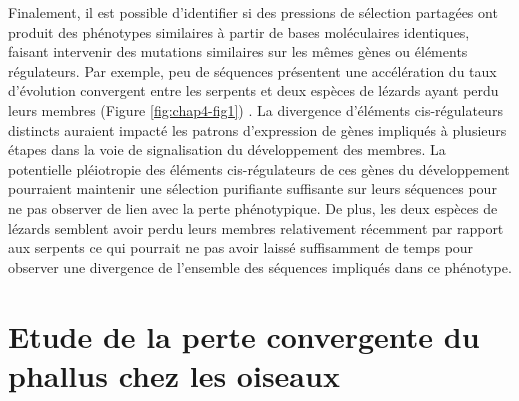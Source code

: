 Finalement, il est possible d’identifier si des pressions de sélection partagées ont produit des phénotypes similaires à partir de bases moléculaires identiques, faisant intervenir des mutations similaires sur les mêmes gènes ou éléments régulateurs. Par exemple, peu de séquences présentent une accélération du taux d’évolution convergent entre les serpents et deux espèces de lézards ayant perdu leurs membres (Figure \ref{fig:chap4-fig1}) \citep{roscito_convergent_2022}. La divergence d’éléments \acrshort{cis}-régulateurs distincts auraient impacté les patrons d’expression de gènes impliqués à plusieurs étapes dans la voie de signalisation du développement des membres. La potentielle pléiotropie des éléments \acrshort{cis}-régulateurs de ces gènes du développement pourraient maintenir une sélection purifiante suffisante sur leurs séquences pour ne pas observer de lien avec la perte phénotypique. De plus, les deux espèces de lézards semblent avoir perdu leurs membres relativement récemment par rapport aux serpents ce qui pourrait ne pas avoir laissé suffisamment de temps pour observer une divergence de l’ensemble des séquences impliqués dans ce phénotype.

\section{Etude de la perte convergente du phallus chez les oiseaux}
\label{sec:evol-phallus}

